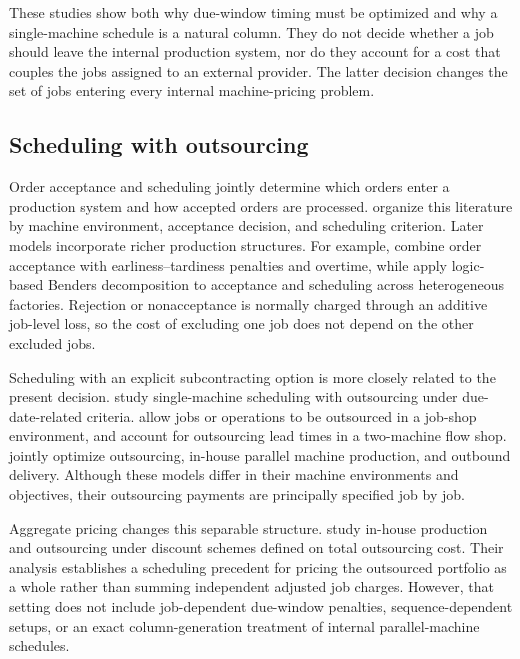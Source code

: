 These studies show both why due-window timing must be optimized and why a
single-machine schedule is a natural column. They do not decide whether a job
should leave the internal production system, nor do they account for a cost that
couples the jobs assigned to an external provider. The latter decision changes the
set of jobs entering every internal machine-pricing problem.

\subsection{Scheduling with outsourcing}

Order acceptance and scheduling jointly determine which orders enter a production
system and how accepted orders are processed. \citet{slotnick2011review} organize
this literature by machine environment, acceptance decision, and scheduling
criterion. Later models incorporate richer production structures. For example,
\citet{li2021acceptance} combine order acceptance with earliness--tardiness
penalties and overtime, while \citet{chen2023lbbd} apply logic-based Benders
decomposition to acceptance and scheduling across heterogeneous factories.
Rejection or nonacceptance is normally charged through an additive job-level loss,
so the cost of excluding one job does not depend on the other excluded jobs.

Scheduling with an explicit subcontracting option is more closely related to the
present decision. \citet{lee2008outsourcing} study single-machine scheduling with
outsourcing under due-date-related criteria. \citet{safarzadeh2019jobshop} allow
jobs or operations to be outsourced in a job-shop environment, and
\citet{kim2022flowshop} account for outsourcing lead times in a two-machine flow
shop. \citet{zhong2022coordinated} jointly optimize outsourcing, in-house parallel
machine production, and outbound delivery. Although these models differ in their
machine environments and objectives, their outsourcing payments are principally
specified job by job.

Aggregate pricing changes this separable structure. \citet{lu2021discount} study
in-house production and outsourcing under discount schemes defined on total
outsourcing cost. Their analysis establishes a scheduling precedent for pricing
the outsourced portfolio as a whole rather than summing independent adjusted job
charges. However, that setting does not include job-dependent due-window penalties,
sequence-dependent setups, or an exact column-generation treatment of internal
parallel-machine schedules.

